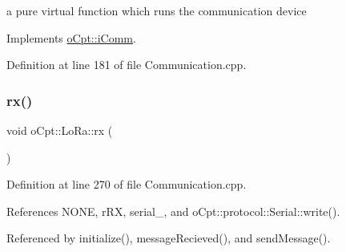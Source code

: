 a pure virtual function which runs the communication device 

Implements \hyperlink{classo_cpt_1_1i_comm_a0d15a29fb59dd6a74b56a126d03b9170}{o\+Cpt\+::i\+Comm}.



Definition at line 181 of file Communication.\+cpp.

\hypertarget{classo_cpt_1_1_lo_ra_aa9051cc9d611edc2b5e1f36124d4e972}{}\label{classo_cpt_1_1_lo_ra_aa9051cc9d611edc2b5e1f36124d4e972} 
\subsubsection{\texorpdfstring{rx()}{rx()}}
{\footnotesize\ttfamily void o\+Cpt\+::\+Lo\+Ra\+::rx (\begin{DoxyParamCaption}{ }\end{DoxyParamCaption})\hspace{0.3cm}{\ttfamily [protected]}}



Definition at line 270 of file Communication.\+cpp.



References N\+O\+NE, r\+RX, serial\+\_\+, and o\+Cpt\+::protocol\+::\+Serial\+::write().



Referenced by initialize(), message\+Recieved(), and send\+Message().


